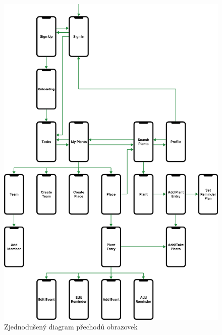 \documentclass[thesis=M,czech]{FITthesis}[2019/12/23]
\begin{document}
\begin{figure}
	\centering
	\includegraphics[width=1\linewidth]{images/view-flow.pdf}
  	\caption{Zjednodušený diagram přechodů obrazovek}
  	\label{img:view-flow}
\end{figure}
\end{document}
